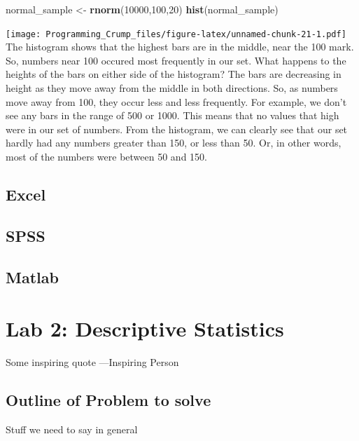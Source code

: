 \documentclass[]{book}
\newenvironment{Shaded}{\begin{snugshade}}{\end{snugshade}}
\newcommand{\KeywordTok}[1]{\textcolor[rgb]{0.13,0.29,0.53}{\textbf{{#1}}}}
\newcommand{\DecValTok}[1]{\textcolor[rgb]{0.00,0.00,0.81}{{#1}}}
\newcommand{\StringTok}[1]{\textcolor[rgb]{0.31,0.60,0.02}{{#1}}}
\newcommand{\NormalTok}[1]{{#1}}
\theoremstyle{definition}
\theoremstyle{definition}
\theoremstyle{definition}
\theoremstyle{remark}
\begin{document}
\begin{Shaded}
\begin{Highlighting}[]
\NormalTok{normal_sample <-}\StringTok{ }\KeywordTok{rnorm}\NormalTok{(}\DecValTok{10000}\NormalTok{,}\DecValTok{100}\NormalTok{,}\DecValTok{20}\NormalTok{)}
\KeywordTok{hist}\NormalTok{(normal_sample)}
\end{Highlighting}
\end{Shaded}

\texttt{[image: Programming\_Crump\_files/figure-latex/unnamed-chunk-21-1.pdf]}
The histogram shows that the highest bars are in the middle, near the
100 mark. So, numbers near 100 occured most frequently in our set. What
happens to the heights of the bars on either side of the histogram? The
bars are decreasing in height as they move away from the middle in both
directions. So, as numbers move away from 100, they occur less and less
frequently. For example, we don't see any bars in the range of 500 or
1000. This means that no values that high were in our set of numbers.
From the histogram, we can clearly see that our set hardly had any
numbers greater than 150, or less than 50. Or, in other words, most of
the numbers were between 50 and 150.

\section{Excel}\label{excel}

\section{SPSS}\label{spss}

\section{Matlab}\label{matlab}

\chapter{Lab 2: Descriptive
Statistics}\label{lab-2-descriptive-statistics}

{ Some inspiring quote ---Inspiring Person }

\section{Outline of Problem to solve}\label{outline-of-problem-to-solve}

Stuff we need to say in general
\end{document}
